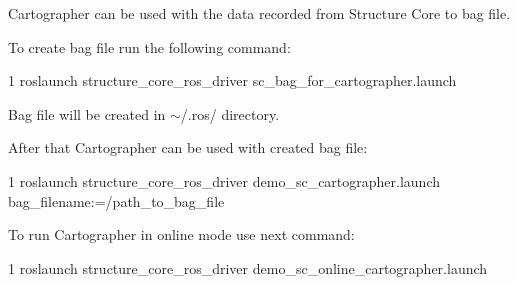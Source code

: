 Cartographer can be used with the data recorded from Structure Core to bag file.

To create bag file run the following command\+:


\begin{DoxyCode}
1 roslaunch structure\_core\_ros\_driver sc\_bag\_for\_cartographer.launch
\end{DoxyCode}


Bag file will be created in {\ttfamily $\sim$/.ros/} directory.

After that Cartographer can be used with created bag file\+:


\begin{DoxyCode}
1 roslaunch structure\_core\_ros\_driver demo\_sc\_cartographer.launch bag\_filename:=/path\_to\_bag\_file
\end{DoxyCode}


To run Cartographer in online mode use next command\+:


\begin{DoxyCode}
1 roslaunch structure\_core\_ros\_driver demo\_sc\_online\_cartographer.launch 
\end{DoxyCode}
 